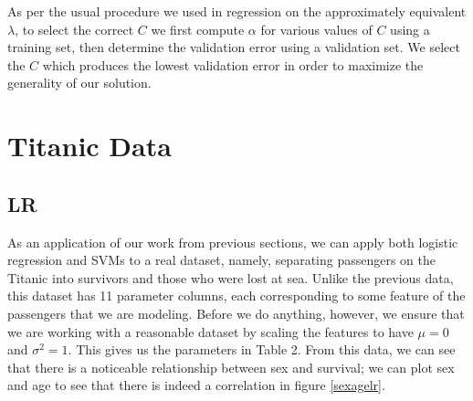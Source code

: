 \documentclass[10pt,letterpaper]{article}
\begin{document}
As per the usual procedure we used in regression on the approximately equivalent $\lambda$, to select the correct $C$ we first compute $\alpha$ for various values of $C$ using a training set, then determine the validation error using a validation set. We select the $C$ which produces the lowest validation error in order to maximize the generality of our solution.
\section{Titanic Data}

\subsection{LR}
As an application of our work from previous sections, we can apply both logistic regression and SVMs to a real dataset, namely, separating passengers on the Titanic into survivors and those who were lost at sea. Unlike the previous data, this dataset has 11 parameter columns, each corresponding to some feature of the passengers that we are modeling. Before we do anything, however, we ensure that we are working with a reasonable dataset by scaling the features to have $\mu = 0$ and $\sigma^2 = 1$. This gives us the parameters in Table 2. From this data, we can see that there is a noticeable relationship between sex and survival; we can plot sex and age to see that there is indeed a correlation in figure \ref{sexagelr}.
\end{document}
